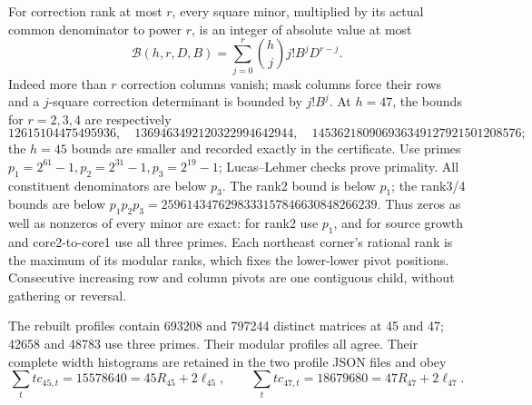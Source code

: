 \documentclass[11pt]{article}
\begin{document}
For correction rank at most $r$, every square minor, multiplied by its
actual common denominator to power $r$, is an integer of absolute value
at most
\[
 \mathcal B(h,r,D,B)=\sum_{j=0}^r\binom hjj!B^jD^{r-j}.
\]
Indeed more than $r$ correction columns vanish; mask columns force their
rows and a $j$-square correction determinant is bounded by $j!B^j$.
At $h=47$, the bounds for $r=2,3,4$ are respectively
\[
12615104475495936,\quad1369463492120322994642944,\quad
145362180906936349127921501208576;
\]
the $h=45$ bounds are smaller and recorded exactly in the certificate.
Use primes $p_1=2^{61}-1,p_2=2^{31}-1,p_3=2^{19}-1$; Lucas--Lehmer checks
prove primality. All constituent denominators are below $p_3$.
The rank2 bound is below $p_1$; the rank3/4 bounds are below
$p_1p_2p_3=2596143476298333157846630848266239$.
Thus zeros as well as nonzeros of every minor are exact: for rank2 use
$p_1$, and for source growth and core2-to-core1 use all three primes.
Each northeast corner's rational rank is the maximum of its modular ranks,
which fixes the lower-lower pivot positions. Consecutive increasing row and
column pivots are one contiguous child, without gathering or reversal.

The rebuilt profiles contain 693208 and 797244 distinct matrices at 45 and 47;
42658 and 48783 use three primes. Their modular profiles all agree. Their
complete width histograms are retained in the two profile JSON files and obey
\[
 \sum_ttc_{45,t}=15578640=45R_{45}+2\ell_{45},\qquad
 \sum_ttc_{47,t}=18679680=47R_{47}+2\ell_{47}.
\]
\end{document}
